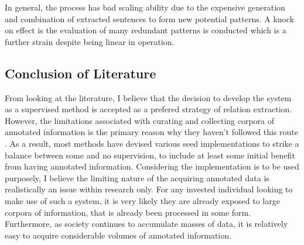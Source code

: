 \documentclass[12pt]{article} %
\begin{document}
In general, the process has bad scaling ability due to the expensive generation and combination of extracted sentences to form new potential patterns. A knock on effect is the evaluation of many redundant patterns is conducted which is a further strain despite being linear in operation.

\subsection{Conclusion of Literature}

From looking at the literature, I believe that the decision to develop the system as a supervised method is accepted as a prefered strategy of relation extraction. However, the limitations associated with curating and collecting corpora of annotated information is the primary reason why they haven’t followed this route \cite{selfsupervisedExtraction}\cite{learningPartWhole}\cite{espressoExtraction}. As a result, most methods have devised various seed implementations to strike a balance between some and no supervision, to include at least some initial benefit from having annotated information. Considering the implementation is to be used purposely, I believe the limiting nature of the acquiring annotated data is realistically an issue within research only. For any invested individual looking to make use of such a system, it is very likely they are already exposed to large corpora of information, that is already been processed in some form. Furthermore, as society continues to accumulate masses of data, it is relatively easy to acquire considerable volumes of annotated information.\\
\end{document}
